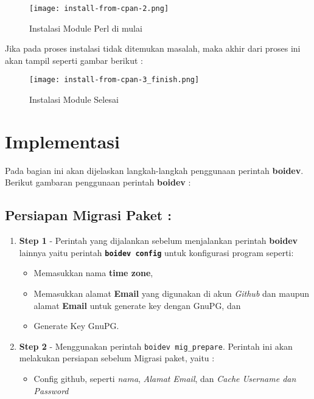 {\begin{figure}[H]
	\centering
	\texttt{[image: install-from-cpan-2.png]}
	\caption{Instalasi Module Perl di mulai}
	\label{fig:bab2_start_install_module}
\end{figure}

\noindent
Jika pada proses instalasi tidak ditemukan masalah, maka akhir dari proses ini akan tampil seperti gambar berikut :

\begin{figure}[H]
	\centering
	\texttt{[image: install-from-cpan-3\_finish.png]}
	\caption{Instalasi Module Selesai}
	\label{fig:bab1_finish_install_module}
\end{figure}

\section{Implementasi}
\label{subsec:implm}
\noindent
Pada bagian ini akan dijelaskan langkah-langkah penggunaan perintah \textbf{boidev}. Berikut gambaran penggunaan perintah \textbf{boidev} :

\subsection{Persiapan Migrasi Paket :}
\begin{enumerate}
	\item \textbf{Step 1} - Perintah yang dijalankan sebelum menjalankan perintah \textbf{boidev} lainnya yaitu perintah \textbf{\texttt{boidev config}} untuk konfigurasi program seperti:\label{itm:pre_step1}
	\begin{itemize}
		\item Memasukkan nama \textbf{time zone},
		\item Memasukkan alamat \textbf{Email} yang digunakan di akun \textit{Github} dan maupun alamat \textbf{Email} untuk generate key dengan GnuPG, dan
		\item Generate Key GnuPG.
	\end{itemize}
	
	\item \textbf{Step 2} - Menggunakan perintah \texttt{boidev mig\_prepare}. Perintah ini akan melakukan persiapan sebelum Migrasi paket, yaitu :
	\label{itm:pre_step2}
	\begin{itemize}
		\item Config github, seperti \textit{nama}, \textit{Alamat Email}, dan \textit{Cache Username dan Password}
		

\end{itemize}
\end{enumerate}}
